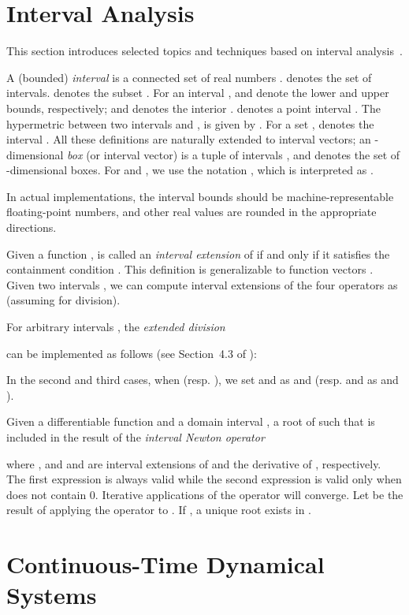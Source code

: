 \documentclass[paper]{ieice}
\begin{document}
\section{Interval Analysis}
\label{s:interval}

This section introduces selected topics and techniques based on interval analysis~\cite{Moore1966,Neumaier1990}.



A (bounded) \textit{interval}  is a connected set of real numbers .
 denotes the set of intervals. 
 denotes the subset .
For an interval ,
 and  denote the lower and upper bounds, respectively; and
 denotes the interior .
 denotes a point interval .
The hypermetric between two intervals  and ,
 is given by .
For a set ,  denotes the interval .
All these definitions are naturally extended to interval vectors;
an -dimensional \textit{box} (or interval vector)  is a tuple of  intervals
, and
 denotes the set of -dimensional boxes.
For  and ,
we use the notation , which is interpreted as .

In actual implementations, the interval bounds should be machine-representable floating-point numbers, and other real values are rounded in the appropriate directions.



Given a function ,
 is called an \emph{interval extension} of  if and only if it satisfies the containment condition
.
This definition is generalizable to function vectors .
Given two intervals , we can compute interval extensions of the four operators  as  (assuming  for division).

For arbitrary intervals , the \emph{extended division} 

can be implemented as follows (see Section~4.3 of \cite{Neumaier1990}):

In the second and third cases, when  (resp. ), we set  and  as  and  (resp.  and  as  and ).



Given a differentiable function  and a domain interval ,
a root  of  such that  is included in the result of the \emph{interval Newton operator}

where , and  and  are interval extensions of  and the derivative of , respectively. 
The first expression is always valid while the second expression is valid only when  does not contain 0.
Iterative applications of the operator will converge.
Let  be the result of applying the operator to . If , a unique root exists in .


\section{Continuous-Time Dynamical Systems}
\label{s:cs}
\end{document}
